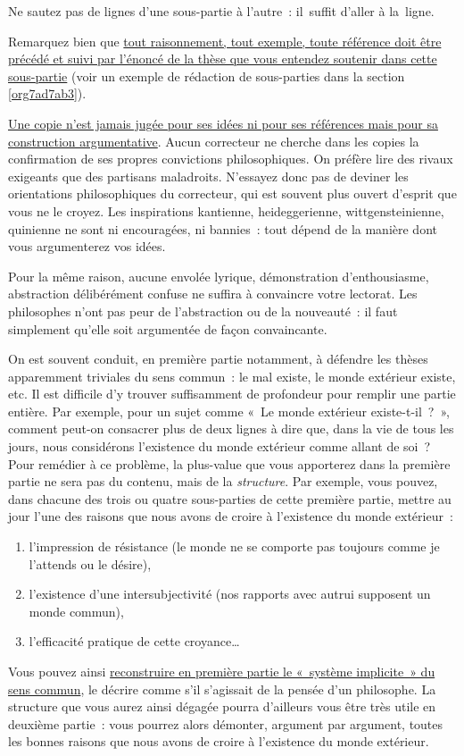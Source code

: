 \documentclass[a4paper,12pt]{report}
\begin{document}
Ne sautez pas de lignes d'une sous-partie à l'autre : il suffit d'aller
à la ligne.

Remarquez bien que \uline{tout raisonnement, tout exemple, toute référence
doit être précédé et suivi par l'énoncé de la thèse que vous entendez
soutenir dans cette sous-partie} (voir un exemple de rédaction de
sous-parties dans la section \ref{org7ad7ab3}).

\uline{Une copie n'est jamais jugée pour ses idées ni pour ses références mais
pour sa construction argumentative}. Aucun correcteur ne cherche dans
les copies la confirmation de ses propres convictions philosophiques. On
préfère lire des rivaux exigeants que des partisans maladroits.
N'essayez donc pas de deviner les orientations philosophiques du
correcteur, qui est souvent plus ouvert d'esprit que vous ne le croyez.
Les inspirations kantienne, heideggerienne, wittgensteinienne, quinienne
ne sont ni encouragées, ni bannies : tout dépend de la manière dont vous
argumenterez vos idées.

Pour la même raison, aucune envolée lyrique, démonstration
d'enthousiasme, abstraction délibérément confuse ne suffira à convaincre
votre lectorat. Les philosophes n'ont pas peur de l'abstraction ou de la
nouveauté : il faut simplement qu'elle soit argumentée de façon
convaincante.

On est souvent conduit, en première partie notamment, à défendre les
thèses apparemment triviales du sens commun : le mal existe, le monde
extérieur existe, etc. Il est difficile d'y trouver suffisamment de
profondeur pour remplir une partie entière. Par exemple, pour un sujet
comme « Le monde extérieur existe-t-il ? », comment peut-on consacrer
plus de deux lignes à dire que, dans la vie de tous les jours, nous
considérons l'existence du monde extérieur comme allant de soi ?
Pour remédier à ce problème, la plus-value que vous apporterez dans la
première partie ne sera pas du contenu, mais de la \emph{structure}. Par
exemple, vous pouvez, dans chacune des trois ou quatre sous-parties de
cette première partie, mettre au jour l'une des raisons que nous avons
de croire à l'existence du monde extérieur :
\begin{enumerate}
\item l'impression de résistance (le monde ne se comporte pas toujours
comme je l'attends ou le désire),
\item l'existence d'une intersubjectivité (nos rapports avec autrui
supposent un monde commun),
\item l'efficacité pratique de cette croyance\ldots{}
\end{enumerate}
Vous pouvez ainsi \uline{reconstruire en première partie le « système
implicite » du sens commun}, le décrire comme s'il s'agissait de la
pensée d'un philosophe. La structure que vous aurez ainsi dégagée pourra
d'ailleurs vous être très utile en deuxième partie : vous pourrez alors
démonter, argument par argument, toutes les bonnes raisons que nous
avons de croire à l'existence du monde extérieur.
\end{document}
